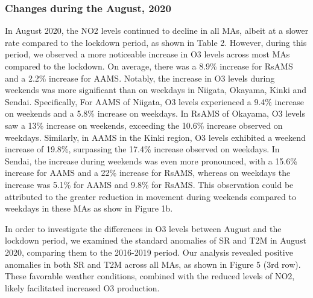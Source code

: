 \subsubsection*{Changes during the August, 2020}
In August 2020, the NO2 levels continued to decline in all MAs, albeit at a slower rate compared to the lockdown period, as shown in Table 2. However, during this period, we observed a more noticeable increase in O3 levels across most MAs compared to the lockdown. On average, there was a 8.9\% increase for RsAMS and a 2.2\% increase for AAMS. Notably, the increase in O3 levels during weekends was more significant than on weekdays in Niigata, Okayama, Kinki and Sendai. Specifically, For AAMS of Niigata, O3 levels experienced a 9.4\% increase on weekends and a 5.8\% increase on weekdays. In RsAMS of Okayama, O3 levels saw a 13\% increase on weekends, exceeding the 10.6\% increase observed on weekdays. Similarly, in AAMS in the Kinki region, O3 levels exhibited a weekend increase of 19.8\%, surpassing the 17.4\% increase observed on weekdays. In Sendai, the increase during weekends was even more pronounced, with a 15.6\% increase for AAMS and a 22\% increase for RsAMS, whereas on weekdays the increase was 5.1\% for AAMS and 9.8\% for RsAMS. This observation could be attributed to the greater reduction in movement during weekends compared to weekdays in these MAs as show in Figure 1b. \par
In order to investigate the differences in O3 levels between August and the lockdown period, we examined the standard anomalies of SR and T2M in August 2020, comparing them to the 2016-2019 period. Our analysis revealed positive anomalies in both SR and T2M across all MAs, as shown in Figure 5 (3rd row). These favorable weather conditions, combined with the reduced levels of NO2, likely facilitated increased O3 production. \par

